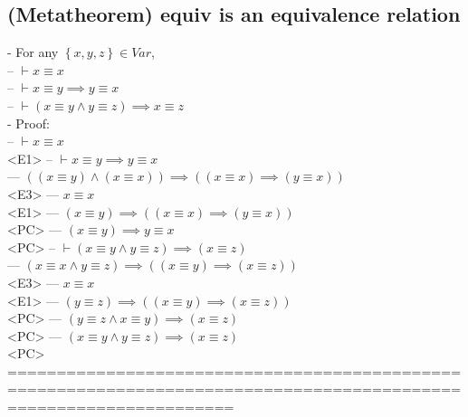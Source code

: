 \documentclass{book}
\newcommand{\set}[1]{\left\{ #1 \right\}}
\begin{document}
\subsection{(Metatheorem) equiv is an equivalence relation} %
	- For any $\set{x, y, z} \in Var$, \\
		-- $\vdash x \equiv x$ \\
		-- $\vdash x \equiv y \implies y \equiv x$ \\
		-- $\vdash (x \equiv y \land y \equiv z) \implies x \equiv z$ \\
	- Proof: \\
		-- $\vdash x \equiv x$ \\ <E1>
		-- $\vdash x \equiv y \implies y \equiv x$ \\
			--- $((x \equiv y) \land (x \equiv x)) \implies ((x \equiv x) \implies (y \equiv x))$ \\ <E3>
			--- $x \equiv x$ \\ <E1>
			--- $(x \equiv y) \implies ((x \equiv x) \implies (y \equiv x))$ \\ <PC>
			--- $(x \equiv y) \implies y \equiv x$ \\ <PC>
		-- $\vdash (x \equiv y \land y \equiv z) \implies (x \equiv z)$ \\
			--- $(x \equiv x \land y \equiv z) \implies ((x \equiv y) \implies (x \equiv z))$ \\ <E3>
			--- $x \equiv x$ \\ <E1>
			--- $(y \equiv z) \implies ((x \equiv y) \implies (x \equiv z))$ \\ <PC>
			--- $(y \equiv z \land x \equiv y) \implies (x \equiv z)$ \\ <PC>
			--- $(x \equiv y \land y \equiv z) \implies (x \equiv z)$ \\ <PC>
	===================================================================================================================
\end{document}

